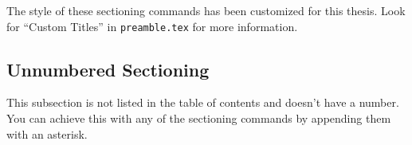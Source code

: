 The style of these sectioning commands has been customized for this thesis. Look for ``Custom Titles'' in \verb|preamble.tex| for more information.

\subsection*{Unnumbered Sectioning}%
This subsection is not listed in the table of contents and doesn't have a number.
You can achieve this with any of the sectioning commands by appending them with an asterisk.
